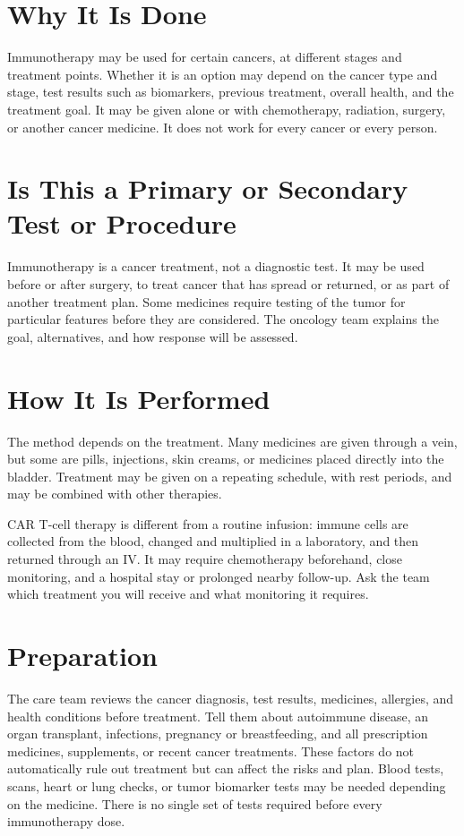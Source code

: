 \section*{Why It Is Done}
Immunotherapy may be used for certain cancers, at different stages and treatment points. Whether it is an option may depend on the cancer type and stage, test results such as biomarkers, previous treatment, overall health, and the treatment goal. It may be given alone or with chemotherapy, radiation, surgery, or another cancer medicine. It does not work for every cancer or every person.

\section*{Is This a Primary or Secondary Test or Procedure}
Immunotherapy is a cancer treatment, not a diagnostic test. It may be used before or after surgery, to treat cancer that has spread or returned, or as part of another treatment plan. Some medicines require testing of the tumor for particular features before they are considered. The oncology team explains the goal, alternatives, and how response will be assessed.

\section*{How It Is Performed}
The method depends on the treatment. Many medicines are given through a vein, but some are pills, injections, skin creams, or medicines placed directly into the bladder. Treatment may be given on a repeating schedule, with rest periods, and may be combined with other therapies.

CAR T-cell therapy is different from a routine infusion: immune cells are collected from the blood, changed and multiplied in a laboratory, and then returned through an IV. It may require chemotherapy beforehand, close monitoring, and a hospital stay or prolonged nearby follow-up. Ask the team which treatment you will receive and what monitoring it requires.

\section*{Preparation}
The care team reviews the cancer diagnosis, test results, medicines, allergies, and health conditions before treatment. Tell them about autoimmune disease, an organ transplant, infections, pregnancy or breastfeeding, and all prescription medicines, supplements, or recent cancer treatments. These factors do not automatically rule out treatment but can affect the risks and plan. Blood tests, scans, heart or lung checks, or tumor biomarker tests may be needed depending on the medicine. There is no single set of tests required before every immunotherapy dose.

